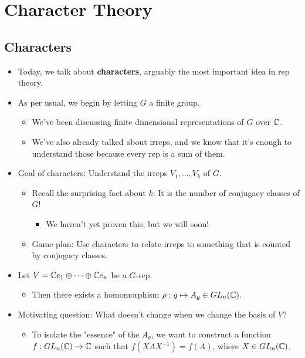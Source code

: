\documentclass[../notes.tex]{subfiles}
\begin{document}
\chapter{Character Theory}
\section{Characters}
\begin{itemize}
    \item {}Today, we talk about \textbf{characters}, arguably the most important idea in rep theory.
    \item As per usual, we begin by letting $G$ a finite group.
    \begin{itemize}
        \item We've been discussing finite dimensional representations of $G$ over $\mathbb{C}$.
        \item We've also already talked about irreps, and we know that it's enough to understand those because every rep is a sum of them.
    \end{itemize}
    \item Goal of characters: Understand the irreps $V_1,\dots,V_k$ of $G$.
    \begin{itemize}
        \item Recall the surprising fact about $k$: It is the number of conjugacy classes of $G$!
        \begin{itemize}
            \item We haven't yet proven this, but we will soon!
        \end{itemize}
        \item Game plan: Use characters to relate irreps to something that is counted by conjugacy classes.
    \end{itemize}
    \item Let $V=\mathbb{C} e_1\oplus\cdots\oplus\mathbb{C} e_n$ be a $G$-rep.
    \begin{itemize}
        \item Then there exists a homomorphism $\rho:g\mapsto A_g\in GL_n(\mathbb{C})$.
    \end{itemize}
    \item Motivating question: What doesn't change when we change the basis of $V$?
    \begin{itemize}
        \item To isolate the "essence" of the $A_g$, we want to construct a function $f:GL_n(\mathbb{C})\to\mathbb{C}$ such that $f(XAX^{-1})=f(A)$, where $X\in GL_n(\mathbb{C})$.
    \end{itemize}

\end{itemize}
\end{document}
